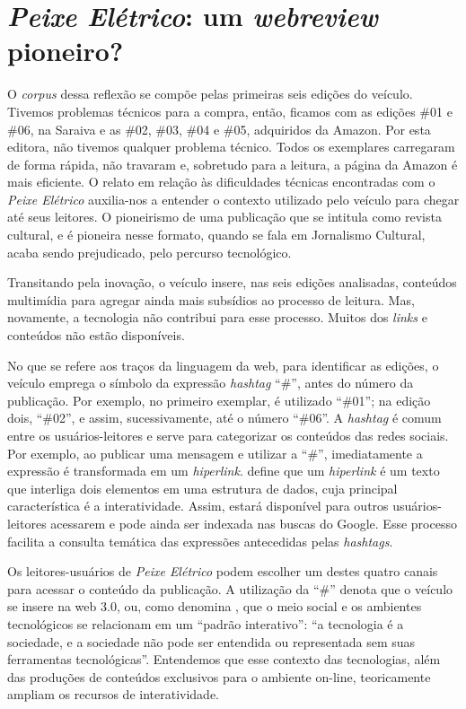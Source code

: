 \documentclass[portuguese]{textolivre}
\begin{document}
\section{\textit{Peixe Elétrico}: um \textit{webreview} pioneiro?}\label{sec-conduta}
O \textit{corpus} dessa reflexão se compõe pelas primeiras seis edições do veículo. Tivemos problemas técnicos para a compra, então, ficamos com as edições \#01 e \#06, na Saraiva e as \#02, \#03, \#04 e \#05, adquiridos da Amazon. Por esta editora, não tivemos qualquer problema técnico. Todos os exemplares carregaram de forma rápida, não travaram e, sobretudo para a leitura, a página da Amazon é mais eficiente. O relato em relação às dificuldades técnicas encontradas com o \textit{Peixe Elétrico} auxilia-nos a entender o contexto utilizado pelo veículo para chegar até seus leitores. O pioneirismo de uma publicação que se intitula como revista cultural, e é pioneira nesse formato, quando se fala em Jornalismo Cultural, acaba sendo prejudicado, pelo percurso tecnológico.

Transitando pela inovação, o veículo insere, nas seis edições analisadas, conteúdos multimídia para agregar ainda mais subsídios ao processo de leitura. Mas, novamente, a tecnologia não contribui para esse processo. Muitos dos \textit{links} e conteúdos não estão disponíveis.

No que se refere aos traços da linguagem da web, para identificar as edições, o veículo emprega o símbolo da expressão \textit{hashtag} “\#”, antes do número da publicação. Por exemplo, no primeiro exemplar, é utilizado “\#01”; na edição dois, “\#02”, e assim, sucessivamente, até o número “\#06”. A \textit{hashtag} é comum entre os usuários-leitores e serve para categorizar os conteúdos das redes sociais. Por exemplo, ao publicar uma mensagem e utilizar a “\#”, imediatamente a expressão é transformada em um \textit{hiperlink}. \textcite{levy1999} define que um \textit{hiperlink} é um texto que interliga dois elementos em uma estrutura de dados, cuja principal característica é a interatividade. Assim, estará disponível para outros usuários-leitores acessarem e pode ainda ser indexada nas buscas do Google. Esse processo facilita a consulta temática das expressões antecedidas pelas \textit{hashtags}.

Os leitores-usuários de \textit{Peixe Elétrico} podem escolher um destes quatro canais para acessar o conteúdo da publicação. A utilização da “\#” denota que o veículo se insere na web 3.0, ou, como denomina \textcite[p. 25]{castells2001}, que o meio social e os ambientes tecnológicos se relacionam em um “padrão interativo”: “a tecnologia é a sociedade, e a sociedade não pode ser entendida ou representada sem suas ferramentas tecnológicas”. Entendemos que esse contexto das tecnologias, além das produções de conteúdos exclusivos para o ambiente on-line, teoricamente ampliam os recursos de interatividade.
\end{document}
